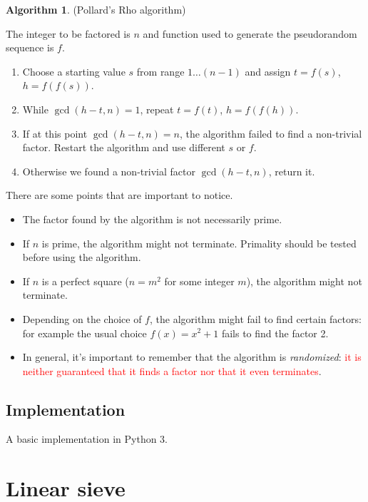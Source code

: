 \documentclass[12pt] {article}
\theoremstyle{plain}
\theoremstyle{definition}
\newtheorem{algo}[thm]{Algorithm}
\begin{document}
\begin{algo} (Pollard's Rho algorithm)

The integer to be factored is $n$ and function used to generate the pseudorandom sequence is $f$.
\begin{enumerate}
\item Choose a starting value $s$ from range $1 \dots (n-1)$ and assign $t = f(s)$, $h = f(f(s))$.
\item While $\gcd(h-t, n) = 1$, repeat $t = f(t)$, $h = f(f(h))$.
\item If at this point $\gcd(h-t, n) = n$, the algorithm failed to find a non-trivial factor. Restart the algorithm and use different $s$ or $f$.
\item Otherwise we found a non-trivial factor $\gcd(h-t, n)$, return it.
\end{enumerate}
\end{algo}

There are some points that are important to notice.

\begin{itemize}
\item The factor found by the algorithm is not necessarily prime.
\item If $n$ is prime, the algorithm might not terminate. Primality should be tested before using the algorithm.
\item If $n$ is a perfect square ($n = m^2$ for some integer $m$), the algorithm might not terminate.
\item Depending on the choice of $f$, the algorithm might fail to find certain factors: for example the usual choice $f(x) = x^2 + 1$ fails to find the factor 2\cite{pollardfail}.
\item In general, it's important to remember that the algorithm is \textit{randomized}: \textcolor{red}{it is neither guaranteed that it finds a factor nor that it even terminates}\cite{clrs}.
\end{itemize}

\subsection {Implementation}

A basic implementation in Python 3.



\section {Linear sieve}
\end{document}
